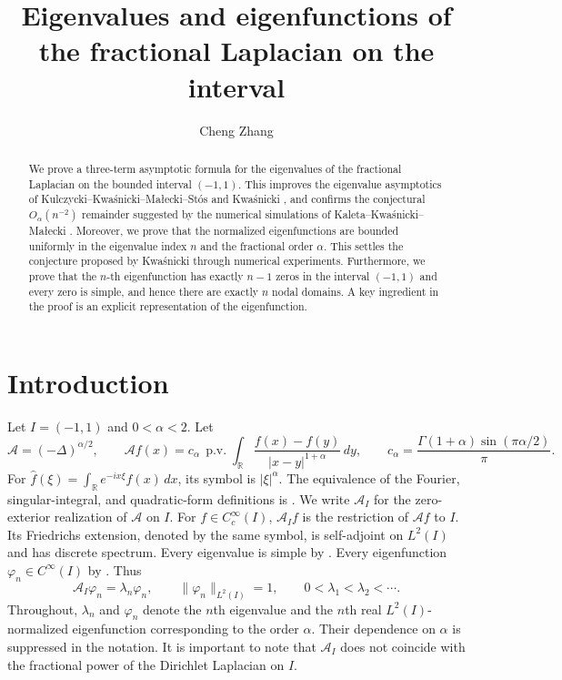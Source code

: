 \documentclass[11pt]{amsart}
\title[Fractional Laplacian on the interval]{Eigenvalues and eigenfunctions 
of the fractional Laplacian on the interval}
\author{Cheng Zhang}
\date{}
\numberwithin{equation}{section}
\theoremstyle{remark}
\newcommand{\R}{\mathbb R}
\newcommand{\norm}[2][]{\lVert #2\rVert_{#1}}
\newcommand{\abs}[1]{\lvert #1\rvert}
\newcommand{\pv}{\operatorname{p.v.}}
\begin{document}
\begin{abstract}
We prove a three-term asymptotic formula for the  eigenvalues of the  fractional
Laplacian  on the bounded interval $(-1,1)$. This improves  the eigenvalue asymptotics of Kulczycki--Kwa\'snicki--Ma{\l}ecki--St\'os \cite{KulczyckiKwasnickiMaleckiStos} and Kwa\'snicki \cite{KwasnickiInterval},  and   confirms the conjectural $O_\alpha(n^{-2})$ remainder suggested by the numerical simulations of Kaleta--Kwa\'snicki--Ma{\l}ecki \cite{KaletaKwasnickiMalecki}. Moreover, we prove  that the normalized
eigenfunctions are  bounded uniformly in the eigenvalue index $n$ and the fractional order $\alpha$. This settles the conjecture proposed by Kwa\'snicki \cite{KwasnickiInterval} through numerical experiments. Furthermore, we prove that the $n$-th eigenfunction has exactly $n-1$ zeros in the interval $(-1,1)$ and every zero is simple, and hence there are exactly $n$ nodal domains. A key ingredient in the proof is an explicit representation of the eigenfunction.
\end{abstract}
\maketitle

\section{Introduction}
\label{sec:intro}



Let $I=(-1,1)$ and $0<\alpha<2$.  Let
\begin{equation}\label{eq:singular-integral}
 \mathcal A=(-\Delta)^{\alpha/2},
 \qquad
 \mathcal Af(x)=c_\alpha\,\pv\!\int_\R
 \frac{f(x)-f(y)}{\abs{x-y}^{1+\alpha}}\,dy,
 \qquad
 c_\alpha=\frac{\Gamma(1+\alpha)\sin(\pi\alpha/2)}{\pi}.
\end{equation}
For $\widehat f(\xi)=\int_\R e^{-ix\xi}f(x)\,dx$, its symbol is
$\abs\xi^\alpha$.  The equivalence of the Fourier, singular-integral, and
quadratic-form definitions is \cite{KwasnickiDefinitions}.
We write $\mathcal A_I$ for the zero-exterior realization of $\mathcal A$ on $I$.  For $f\in C_c^\infty(I)$, $\mathcal A_If$ is the restriction of $\mathcal Af$ to $I$.  Its Friedrichs extension, denoted by the same symbol, is self-adjoint on $L^2(I)$ and has discrete spectrum.  Every eigenvalue is simple by \cite{FallEtAl,kwa23,yzm25}. Every eigenfunction $\varphi_n\in C^\infty(I)$ by \cite{RosOtonSerraRegularity,BorthagarayDelPezzoMartinez, GrubbSpectral}.
Thus
\begin{equation}\label{eq:eigensystem}
	\mathcal A_I\varphi_n=\lambda_n\varphi_n,
	\qquad \norm[L^2(I)]{\varphi_n}=1,
	\qquad 0<\lambda_1<\lambda_2<\cdots.
\end{equation}
 Throughout, $\lambda_n$ and $\varphi_n$ denote the $n$th eigenvalue and the $n$th real
$L^2(I)$-normalized eigenfunction corresponding to the order
$\alpha$.  Their dependence on $\alpha$ is suppressed in the notation. It is important to note that $\mathcal A_I$ does not
coincide with the fractional power of the Dirichlet Laplacian on $I$. 
\end{document}
